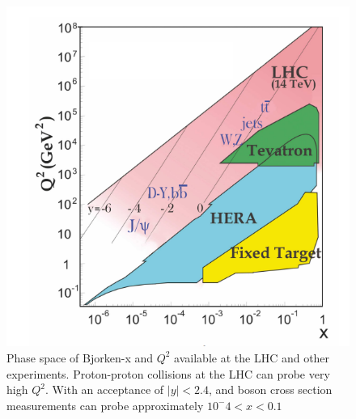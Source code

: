 \begin{figure}
\centering
\includegraphics[width=0.6\linewidth]{plots/SM/structure_probes.PNG}
\caption{Phase space of Bjorken-x and $Q^2$ available at the LHC and other experiments. Proton-proton collisions at the LHC can probe very high $Q^2$. With an acceptance of $|y| < 2.4$, \W and \Z boson cross section measurements can probe approximately $10^-4 < x < 0.1$ \protect\cite{PhysRevD.98.030001}}
\label{fig:sm:summary:xVsQ2}
\end{figure}
